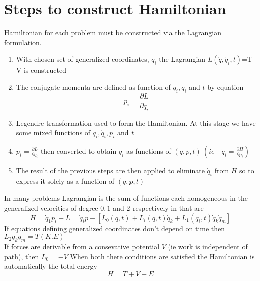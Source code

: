 \section{Steps to construct Hamiltonian}
Hamiltonian for each problem must be constructed via the Lagrangian formulation.
\begin{enumerate}
	\item With chosen set of generalized coordinates, $q_i$ the Lagrangian $L(\dot{q},\dot{q}_i,t)$=T-V is constructed
	\item The conjugate momenta are defined as function of $q_i,\dot{q}_i$ and $t$ by equation
	$$p_i=\frac{\partial L}{\partial \dot{q}_i}$$
	\item Legendre transformation used to form the Hamiltonian. At this stage we have some mixed functions of $q_i,\dot{q}_i,p_i$ and $t$
	\item $p_i=\frac{\partial L}{\partial \dot{q}_i}$ then converted to obtain $\dot{q}_i$ as functions of $(q,p,t)\ (ie\quad \dot{q}_i=\frac{\partial H}{\partial p_i})$
	\item The result of the previous steps are then applied to eliminate $\dot{q}_i$ from $H$ so to express it solely as a function of $(q,p,t)$
\end{enumerate}
\begin{note}
	In many problems Lagrangian is the sum of functions each homogeneous in the generalized velocities of degree $0,1$ and $2$ respectively in that are
	$$ H=\dot{q}_1p_i-L=\dot{q}_ip-[L_0(q,t)+L_i(q,t)\dot{q}_k+L_1(q_i,t)\dot{q}_k\dot{q}_m]$$
	If equations defining generalized coordinates don't depend on time then $L_2 \dot{q}_k\dot{q}_m=T(K.E)$\\
	If forces are derivable from a consevative potential $V$ (ie work is independent of path), then $L_0=-V$
	When both there conditions are satisfied the Hamiltonian is automatically the total energy
	$$H=T+V-E$$
\end{note}





